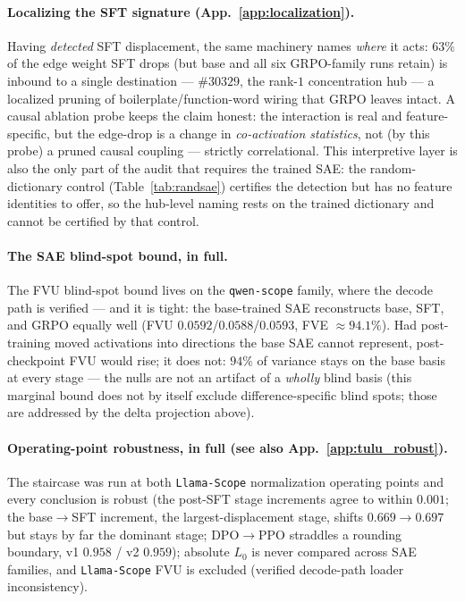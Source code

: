 \documentclass{article}
\begin{document}
\paragraph{Localizing the SFT signature (App.~\ref{app:localization}).} Having \emph{detected} SFT displacement, the same machinery names \emph{where} it acts: $63\%$ of the edge weight SFT drops (but base and all six GRPO-family runs retain) is inbound to a single destination --- $\#30329$, the rank-$1$ concentration hub --- a localized pruning of boilerplate/function-word wiring that GRPO leaves intact. A causal ablation probe keeps the claim honest: the interaction is real and feature-specific, but the edge-drop is a change in \emph{co-activation statistics}, not (by this probe) a pruned causal coupling --- strictly correlational. This interpretive layer is also the only part of the audit that requires the trained SAE: the random-dictionary control (Table~\ref{tab:randsae}) certifies the detection but has no feature identities to offer, so the hub-level naming rests on the trained dictionary and cannot be certified by that control.

\paragraph{The SAE blind-spot bound, in full.} The FVU blind-spot bound lives on the \texttt{qwen-scope} family, where the decode path is verified --- and it is tight: the base-trained SAE reconstructs base, SFT, and GRPO equally well (FVU $0.0592$/$0.0588$/$0.0593$, FVE $\approx94.1\%$). Had post-training moved activations into directions the base SAE cannot represent, post-checkpoint FVU would rise; it does not: $94\%$ of variance stays on the base basis at every stage --- the nulls are not an artifact of a \emph{wholly} blind basis (this marginal bound does not by itself exclude difference-specific blind spots; those are addressed by the delta projection above).

\paragraph{Operating-point robustness, in full (see also App.~\ref{app:tulu_robust}).} The staircase was run at both \texttt{Llama-Scope} normalization operating points and every conclusion is robust (the post-SFT stage increments agree to within $0.001$; the base$\to$SFT increment, the largest-displacement stage, shifts $0.669\to0.697$ but stays by far the dominant stage; DPO$\to$PPO straddles a rounding boundary, v1 $0.958$ / v2 $0.959$); absolute $L_0$ is never compared across SAE families, and \texttt{Llama-Scope} FVU is excluded (verified decode-path loader inconsistency).
\end{document}
